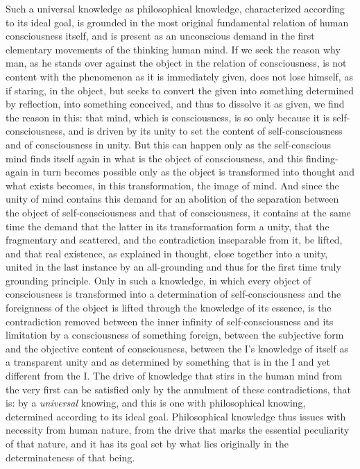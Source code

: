 Such a universal knowledge as philosophical knowledge, characterized
according to its ideal goal, is grounded in the most original
fundamental relation of human consciousness itself, and is present as
an unconscious demand in the first elementary movements of the thinking
human mind. If we seek the reason why man, as he stands over against the
object in the relation of consciousness, is not content with the
phenomenon as it is immediately given, does not lose himself, as if
staring, in the object, but seeks to convert the given into something
determined by reflection, into something conceived, and thus to
dissolve it as given, we find the reason in this: that mind, which is
consciousness, is so only because it is self-consciousness, and is
driven by its unity to set the content of self-consciousness and of
consciousness in unity. But this can happen only as the self-conscious
mind finds itself again in what is the object of consciousness, and this
finding-again in turn becomes possible only as the object is transformed
into thought and what exists becomes, in this transformation, the image
of mind. And since the unity of mind contains this demand for an
abolition of the separation between the object of self-consciousness
and that of consciousness, it contains at the same time the demand that
the latter in its transformation form a unity, that the fragmentary and
scattered, and the contradiction inseparable from it, be lifted, and
that real existence, as explained in thought, close together into a
unity, united in the last instance by an all-grounding and thus for the
first time truly grounding principle. Only in such a
knowledge, in which every object of consciousness is
transformed into a determination of self-consciousness and the
foreignness of the object is lifted through the knowledge of its
essence, is the contradiction removed between the inner infinity of
self-consciousness and its limitation by a consciousness of something
foreign, between the subjective form and the objective content of
consciousness, between the I's knowledge of itself as a transparent
unity and as determined by something that is in the I and yet different
from the I. The drive of knowledge that stirs in the human mind from the
very first can be satisfied only by the annulment of these
contradictions, that is: by a \emph{universal} knowing, and this is one
with philosophical knowing, determined according to its ideal goal.
Philosophical knowledge thus issues with necessity from human nature,
from the drive that marks the essential peculiarity of that nature, and
it has its goal set by what lies originally in the determinateness of
that being.

